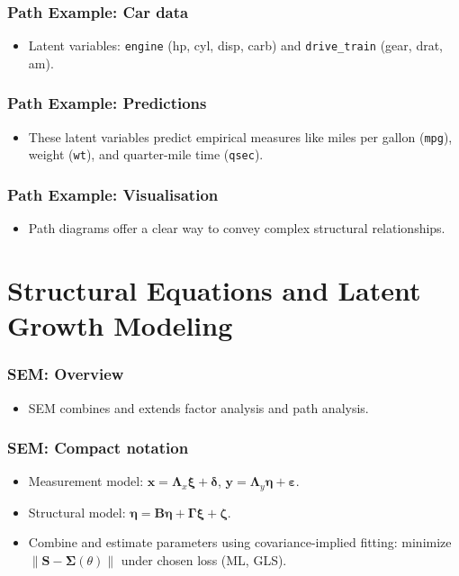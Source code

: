 \documentclass{beamer}
\begin{document}
\begin{frame}
    \frametitle{Path Example: Car data}
    \begin{itemize}
        \item Latent variables: \texttt{engine} (hp, cyl, disp, carb) and \texttt{drive\_train} (gear, drat, am).
    \end{itemize}
\end{frame}

\begin{frame}
    \frametitle{Path Example: Predictions}
    \begin{itemize}
        \item These latent variables predict empirical measures like miles per gallon (\texttt{mpg}), weight (\texttt{wt}), and quarter-mile time (\texttt{qsec}).
    \end{itemize}
\end{frame}

\begin{frame}
    \frametitle{Path Example: Visualisation}
    \begin{itemize}
        \item Path diagrams offer a clear way to convey complex structural relationships.
    \end{itemize}
\end{frame}

\section{Structural Equations and Latent Growth Modeling}
\begin{frame}
    \frametitle{SEM: Overview}
    \begin{itemize}
        \item SEM combines and extends factor analysis and path analysis.
    \end{itemize}
\end{frame}

\begin{frame}
    \frametitle{SEM: Compact notation}
    \begin{itemize}
        \item Measurement model: $\mathbf{x}=\mathbf{\Lambda}_x\mathbf{\xi}+\boldsymbol{\delta}$, $\mathbf{y}=\mathbf{\Lambda}_y\mathbf{\eta}+\boldsymbol{\varepsilon}$.
        \item Structural model: $\mathbf{\eta}=\mathbf{B}\mathbf{\eta}+\mathbf{\Gamma}\mathbf{\xi}+\boldsymbol{\zeta}$.
        \item Combine and estimate parameters using covariance-implied fitting: minimize $\|\mathbf{S}-\boldsymbol{\Sigma}(\theta)\|$ under chosen loss (ML, GLS).
    \end{itemize}
\end{frame}
\end{document}
